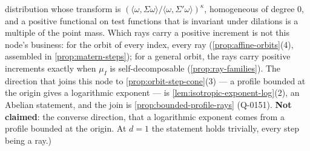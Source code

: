\begin{proposition}
{distribution whose transform is $(\langle\omega,\Sigma\omega\rangle/\langle\omega,\Sigma'\omega\rangle)^\kappa$,
homogeneous of degree $0$, and a positive functional on test functions that is invariant under
dilations is a multiple of the point mass. Which rays carry a positive increment is not this node's business: for the \Matern{} orbit of
every index, every ray (\ref{prop:affine-orbits}(4), assembled in \ref{prop:matern-steps}); for a
general orbit, the rays carry positive increments exactly when $\mu_I$ is self-decomposable
(\ref{prop:ray-families}). The direction that joins this node to \ref{prop:orbit-step-cone}(3) --- a profile bounded at the
origin gives a logarithmic exponent --- is \ref{lem:isotropic-exponent-log}(2), an Abelian
statement, and the join is \ref{prop:bounded-profile-rays} (Q-0151). \textbf{Not claimed}: the
converse direction, that a logarithmic exponent comes from a profile bounded at the origin. At $d = 1$ the statement holds trivially, every step being a ray.)}
\end{proposition}

